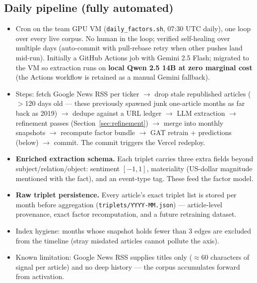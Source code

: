 \documentclass[11pt]{article}
\begin{document}
\subsection{Daily pipeline (fully automated)}
\begin{itemize}
  \item Cron on the team GPU VM (\texttt{daily\_factors.sh}, 07:30 UTC daily), one loop over every live corpus. No human in the loop; verified self-healing over multiple days (auto-commit with pull-rebase retry when other pushes land mid-run). Initially a GitHub Actions job with Gemini 2.5 Flash; migrated to the VM so extraction runs on \textbf{local Qwen 2.5 14B at zero marginal cost} (the Actions workflow is retained as a manual Gemini fallback).
  \item Steps: fetch Google News RSS per ticker \(\to\) drop stale republished articles (\(>\)120 days old --- these previously spawned junk one-article months as far back as 2019) \(\to\) dedupe against a URL ledger \(\to\) LLM extraction \(\to\) refinement passes (Section~\ref{sec:refinement}) \(\to\) merge into monthly snapshots \(\to\) recompute factor bundle \(\to\) GAT retrain + predictions (below) \(\to\) commit. The commit triggers the Vercel redeploy.
  \item \textbf{Enriched extraction schema.} Each triplet carries three extra fields beyond subject/relation/object: sentiment \([-1,1]\), materiality (US-dollar magnitude mentioned with the fact), and an event-type tag. These feed the factor model.
  \item \textbf{Raw triplet persistence.} Every article's exact triplet list is stored per month before aggregation (\texttt{triplets/YYYY-MM.json}) --- article-level provenance, exact factor recomputation, and a future retraining dataset.
  \item Index hygiene: months whose snapshot holds fewer than 3 edges are excluded from the timeline (stray misdated articles cannot pollute the axis).
  \item Known limitation: Google News RSS supplies titles only (\(\approx\)60 characters of signal per article) and no deep history --- the corpus accumulates forward from activation.
\end{itemize}
\end{document}

